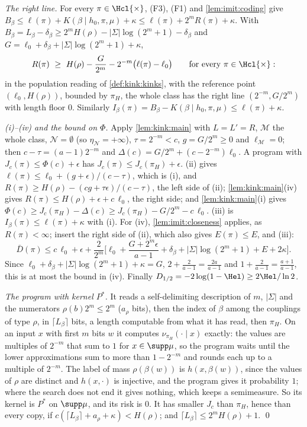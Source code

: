 \emph{The right line.} For every $\pi\in\Hcl{\times}$, (F3), (F1) and \cref{lem:imit:coding} give $B_\beta\le\ell(\pi)+K(\beta\mid h_0,\pi,\mu)+\kappa\le\ell(\pi)+2^mR(\pi)+\kappa$. With $B_\beta=L_\beta-\delta_\beta\ge2^mH(\rho)-|\Sigma|\log(2^m+1)-\delta_\beta$ and $G=\ell_0+\delta_\beta+|\Sigma|\log(2^m+1)+\kappa$,
\[
R(\pi)\ \ge\ H(\rho)-\frac G{2^m}-2^{-m}\big(\ell(\pi)-\ell_0\big)\qquad\text{for every }\pi\in\Hcl{\times}:
\]
in the population reading of \cref{def:kink:kinks}, with the reference point $(\ell_0,H(\rho))$, bounded by $\pi_H$, the whole class has the right line $(2^{-m},G/2^m)$ with length floor $0$. Similarly $I_\beta(\pi)=B_\beta-K(\beta\mid h_0,\pi,\mu)\le\ell(\pi)+\kappa$.

\emph{(i)--(iv) and the bound on $\Phi$.} Apply \cref{lem:kink:main} with $L=L'=R$, $\mathcal M$ the whole class, $\mathcal N=\emptyset$ (so $\eta_{\mathcal N}=+\infty$), $\tau=2^{-m}<c$, $g=G/2^m\ge0$ and $\ell_{\mathcal M}=0$; then $c-\tau=(a-1)2^{-m}$ and $\Delta(c)=G/2^m+(c-2^{-m})\ell_0$. A program with $J_c(\pi)\le\Phi(c)+\epsilon$ has $J_c(\pi)\le J_c(\pi_H)+\epsilon$. (ii) gives $\ell(\pi)\le\ell_0+(g+\epsilon)/(c-\tau)$, which is (i), and $R(\pi)\ge H(\rho)-(cg+\tau\epsilon)/(c-\tau)$, the left side of (ii); \cref{lem:kink:main}(iv) gives $R(\pi)\le H(\rho)+\epsilon+c\,\ell_0$, the right side; and \cref{lem:kink:main}(i) gives $\Phi(c)\ge J_c(\pi_H)-\Delta(c)\ge J_c(\pi_H)-G/2^m-c\,\ell_0$. (iii) is $I_\beta(\pi)\le\ell(\pi)+\kappa$ with (i). For (iv), \cref{lem:imit:closeness} applies, as $R(\pi)<\infty$; insert the right side of (ii), which also gives $E(\pi)\le E$, and (iii):
\[
\bar D(\pi)\le c\,\ell_0+\epsilon+\frac2{2^m}\Big[\ell_0+\frac{G+2^m\epsilon}{a-1}+\delta_\beta+|\Sigma|\log(2^m+1)+E+2\kappa\Big].
\]
Since $\ell_0+\delta_\beta+|\Sigma|\log(2^m+1)+\kappa=G$, $2+\frac2{a-1}=\frac{2a}{a-1}$ and $1+\frac2{a-1}=\frac{a+1}{a-1}$, this is at most the bound in (iv). Finally $D_{1/2}=-2\log(1-\Hel)\ge2\Hel/\ln2$.

\emph{The program with kernel $P^*$.} It reads a self-delimiting description of $m$, $|\Sigma|$ and the numerators $\rho(b)2^m\le2^m$ ($a_\rho$ bits), then the index of $\beta$ among the couplings of type $\rho$, in $\lceil L_\beta\rceil$ bits, a length computable from what it has read, then $\pi_H$. On an input $x$ with first $m$ bits $w$ it computes $\nu_{\pi_H}(\cdot\mid x)$ exactly: the values are multiples of $2^{-m}$ that sum to $1$ for $x\in\supp\mu$, so the program waits until the lower approximations sum to more than $1-2^{-m}$ and rounds each up to a multiple of $2^{-m}$. The label of mass $\rho(\beta(w))$ is $h(x,\beta(w))$, since the values of $\rho$ are distinct and $h(x,\cdot)$ is injective, and the program gives it probability $1$; where the search does not end it gives nothing, which keeps a semimeasure. So its kernel is $P^*$ on $\supp\mu$, and its risk is $0$. It has smaller $J_c$ than $\pi_H$, hence than every copy, if $c(\lceil L_\beta\rceil+a_\rho+\kappa)<H(\rho)$; and $\lceil L_\beta\rceil\le2^mH(\rho)+1$. \qed

